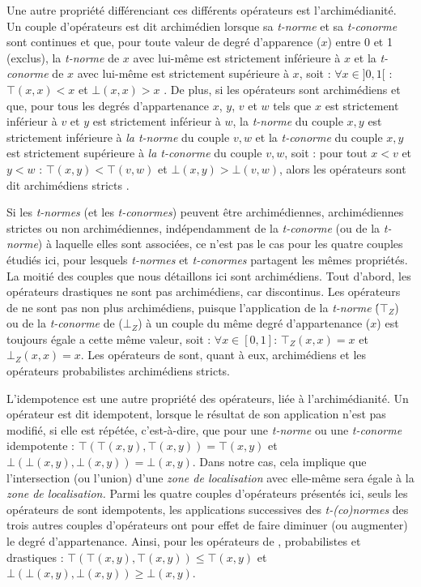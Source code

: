Une autre propriété différenciant ces différents opérateurs est
l'archimédianité. Un couple d'opérateurs est dit archimédien lorsque
sa \emph{t-norme} et sa \emph{t-conorme} sont continues et que, pour
toute valeur de degré d’apparence (\(x\)) entre 0 et 1 (exclus), la
\emph{t-norme} de \(x\) avec lui-même est strictement inférieure à
\(x\) et la \emph{t-conorme} de \(x\) avec lui-même est strictement
supérieure à \(x\), soit : \(\forall x \in ]0,1[\) : \(⊤(x,x) < x\) et
\(⊥(x,x) > x\) \autocite{Bouchon-Meunier1995}. De plus, si les
opérateurs sont archimédiens et que, pour tous les degrés
d'appartenance \(x\), \(y\), \(v\) et \(w\) tels que \(x\) est
strictement inférieur à \(v\) et \(y\) est strictement inférieur à
\(w\), la \emph{t-norme} du couple \(x,y\) est strictement inférieure
à \emph{la t-norme} du couple \(v, w\) et la \emph{t-conorme} du
couple \(x,y\) est strictement supérieure à \emph{la t-conorme} du
couple \(v, w\), soit : pour tout \(x < v\) et \(y < w\) :
\(⊤(x,y) < ⊤(v,w)\) et \(⊥(x,y) > ⊥(v,w)\), alors les opérateurs sont
dit archimédiens stricts \autocite{Bouchon-Meunier1995}.

Si les \emph{t-normes} (et les \emph{t-conormes}) peuvent être
archimédiennes, archimédiennes strictes ou non archimédiennes,
indépendamment de la \emph{t-conorme} (ou de la \emph{t-norme}) à
laquelle elles sont associées, ce n'est pas le cas pour les quatre
couples étudiés ici, pour lesquels \emph{t-normes} et
\emph{t-conormes} partagent les mêmes propriétés. La moitié des
couples que nous détaillons ici sont archimédiens. Tout d'abord, les
opérateurs drastiques ne sont pas archimédiens, car discontinus. Les
opérateurs de \textcite{Zadeh1965} ne sont pas non plus archimédiens,
puisque l’application de la \emph{t-norme} (́\(⊤_Z\)) ou de la
\emph{t-conorme} de  (\(⊥_Z\)) à un couple du même degré
d'appartenance (\(x\)) est toujours égale a cette même valeur, soit :
\(∀ x ∈ [0,1]\): \(⊤_Z(x,x) = x\) et \(⊥_Z(x,x) = x\).
%
Les opérateurs de  sont, quant à eux, archimédiens et
les opérateurs probabilistes archimédiens stricts.

L’idempotence est une autre propriété des opérateurs, liée à
l'archimédianité. Un opérateur est dit idempotent, lorsque le résultat
de son application n'est pas modifié, si elle est répétée,
c'est-à-dire, que pour une \emph{t-norme} ou une \emph{t-conorme}
idempotente : \(⊤(⊤(x,y), ⊤(x,y)) = ⊤(x,y)\) et
\(⊥(⊥(x,y),⊥(x,y)) = ⊥(x,y)\).  Dans notre cas, cela implique que
l'intersection (ou l'union) d'une \emph{zone de localisation} avec
elle-même sera égale à la \emph{zone de localisation.}  Parmi les
quatre couples d'opérateurs présentés ici, seuls les opérateurs de
 sont idempotents, les applications successives des
\emph{t-(co)normes} des trois autres couples d'opérateurs ont pour
effet de faire diminuer (ou augmenter) le degré d'appartenance. Ainsi,
pour les opérateurs de , probabilistes et drastiques
: \(⊤(⊤(x,y), ⊤(x,y)) ≤ ⊤(x,y)\) et \(⊥(⊥(x,y),⊥(x,y)) ≥ ⊥(x,y)\).

